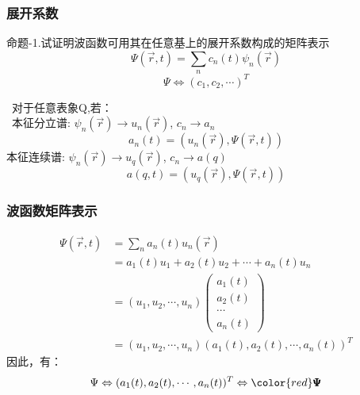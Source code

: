 \begin{frame} 
    \frametitle{展开系数}   
    \begin{exampleblock}{命题-1.试证明波函数可用其在任意基上的展开系数构成的矩阵表示}
        $$ \Psi(\vec{r},t)=\sum_n c_n(t) \psi_n(\vec{r})$$ 
        $$ \Psi\Leftrightarrow(c_1,c_2,\cdots)^T $$   
    \end{exampleblock}
    \证 ~对于任意表象Q,若：\\
     本征分立谱: $\psi_n(\vec{r}) \to u_n(\vec{r})$, $c_n \to a_n $
        \begin{equation*}
            a_n(t)=(u_n(\vec{r}), \Psi(\vec{r},t)) 
        \end{equation*}  
    本征连续谱: $\psi_n(\vec{r}) \to u_q(\vec{r})$, $c_n \to a(q) $
        \begin{equation*}
            a(q,t)=(u_q(\vec{r}), \Psi(\vec{r},t)) 
        \end{equation*}  
\end{frame} 

\begin{frame} 
        \frametitle{波函数矩阵表示} 
        \begin{equation*}
            \begin{split} 
                \Psi(\vec{r},t)&=\sum_n a_n(t) u_n(\vec{r}) \\
                &=a_1(t) u_1+ a_2(t) u_2+\cdots+ a_n(t) u_n \\
                &=(u_1,u_2,\cdots,u_n) 
               \begin{pmatrix}
                    a_1(t)\\
                    a_2(t)\\
                    \cdots\\
                    a_n(t)
                \end{pmatrix} \\
                &= (u_1,u_2,\cdots,u_n) (a_1(t),a_2(t),\cdots, a_n(t))^T
            \end{split}  
        \end{equation*}  
        因此，有： $$   \Psi \Leftrightarrow (a_1(t),a_2(t),\cdots, a_n(t))^T \Leftrightarrow {\color{red}  \pmb {\Psi} } $$
\end{frame}

